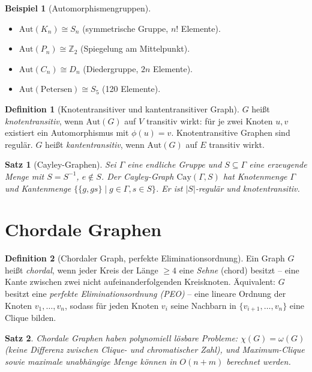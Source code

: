 ﻿\documentclass[a4paper,12pt,openany,oneside]{book}
\theoremstyle{definition}
\newtheorem{definition}{Definition}[chapter]
\newtheorem{beispiel}{Beispiel}[chapter]
\theoremstyle{plain}
\newtheorem{satz}{Satz}[chapter]
\theoremstyle{remark}
\begin{document}
\begin{beispiel}[Automorphismengruppen]
  \begin{itemize}
    \item $\mathrm{Aut}(K_n) \cong S_n$ (symmetrische Gruppe, $n!$ Elemente).
    \item $\mathrm{Aut}(P_n) \cong \mathbb{Z}_2$ (Spiegelung am Mittelpunkt).
    \item $\mathrm{Aut}(C_n) \cong D_n$ (Diedergruppe, $2n$ Elemente).
    \item $\mathrm{Aut}(\text{Petersen}) \cong S_5$ (120 Elemente).
  \end{itemize}
\end{beispiel}

\begin{definition}[Knotentransitiver und kantentransitiver Graph]
  $G$ hei\ss{}t \emph{knotentransitiv}, wenn $\mathrm{Aut}(G)$ auf $V$
  transitiv wirkt: f\"ur je zwei Knoten $u,v$ existiert ein Automorphismus
  mit $\phi(u) = v$. Knotentransitive Graphen sind regul\"ar.
  $G$ hei\ss{}t \emph{kantentransitiv}, wenn $\mathrm{Aut}(G)$ auf $E$
  transitiv wirkt.
\end{definition}

\begin{satz}[Cayley-Graphen]
  Sei $\Gamma$ eine endliche Gruppe und $S \subseteq \Gamma$ eine
  erzeugende Menge mit $S = S^{-1}$, $e \notin S$. Der
  \emph{Cayley-Graph} $\mathrm{Cay}(\Gamma, S)$ hat Knotenmenge $\Gamma$
  und Kantenmenge $\{\{g, gs\} \mid g \in \Gamma, s \in S\}$.
  Er ist $|S|$-regul\"ar und knotentransitiv.
\end{satz}

\section{Chordale Graphen}

\begin{definition}[Chordaler Graph, perfekte Eliminationsordnung]
  Ein Graph $G$ hei\ss{}t \emph{chordal}, wenn jeder Kreis der L\"ange
  $\geq 4$ eine \emph{Sehne} (chord) besitzt -- eine Kante zwischen zwei
  nicht aufeinanderfolgenden Kreisknoten. \"Aquivalent: $G$ besitzt eine
  \emph{perfekte Eliminationsordnung (PEO)} -- eine lineare Ordnung der
  Knoten $v_1, \ldots, v_n$, sodass f\"ur jeden Knoten $v_i$ seine
  Nachbarn in $\{v_{i+1},\ldots,v_n\}$ eine Clique bilden.
\end{definition}

\begin{satz}
  Chordale Graphen haben polynomiell l\"osbare Probleme:
  $\chi(G) = \omega(G)$ (keine Differenz zwischen Clique- und
  chromatischer Zahl), und Maximum-Clique sowie maximale unabh\"angige
  Menge k\"onnen in $O(n+m)$ berechnet werden.
\end{satz}
\end{document}
